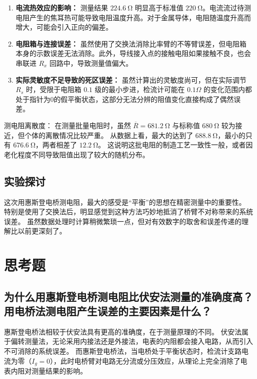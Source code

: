 \documentclass{../template/Report}%
\begin{document}
\begin{fullreportonly}
\begin{enumerate}
        \item \textbf{电流热效应的影响：}
              测量结果 $\SI{224.6}{\ohm}$ 明显高于标准值 $\SI{220}{\ohm}$。电流流过待测电阻产生的焦耳热可能导致电阻温度升高。对于金属导体，电阻随温度升高而增大，可能会引入正向的偏差。

        \item \textbf{电阻箱与连接误差：}
              虽然使用了交换法消除比率臂的不等臂误差，但电阻箱本身的示数误差无法消除。此外，导线接入点的接触电阻如果接触不良，也会串联进 $R_x$ 回路中，导致测量值偏大。

        \item \textbf{实际灵敏度不足导致的死区误差：}
              虽然计算出的灵敏度尚可，但在实际调节 $R_s$ 时，受限于电阻箱 $0.1$ 级的最小步进，检流计可能在 $0.1\Omega$ 的变化范围内都处于指针为0的假平衡状态，这部分无法分辨的阻值变化直接构成了偶然误差。
    \end{enumerate}

    测电阻离散度：
    在测量批量电阻时，虽然 $\overline{R} = \SI{681.2}{\ohm}$ 与标称值 $\SI{680}{\ohm}$ 较为接近，但个体的离散情况比较严重。
    从数据上看，最大的达到了 $\SI{688.8}{\ohm}$，最小的只有 $\SI{676.6}{\ohm}$，两者相差了 $\SI{12.2}{\ohm}$。
    这说明这批电阻的制造工艺一致性一般，或者因老化程度不同导致阻值出现了较大的随机分布。
    \subsection{实验探讨}

    这次用惠斯登电桥测电阻，最大的感受是“平衡”的思想在精密测量中的重要性。
    特别是使用了交换法后，明显感觉到这种方法巧妙地抵消了桥臂不对称带来的系统误差。
    虽然数据处理时计算稍微繁琐一点，但对有效数字的取舍和误差传递的理解比以前更深刻了。

    \section{思考题}

    \subsection{为什么用惠斯登电桥测电阻比伏安法测量的准确度高？用电桥法测电阻产生误差的主要因素是什么？}

    惠斯登电桥法相较于伏安法具有更高的准确度，在于测量原理的不同。
    伏安法属于偏转测量法，无论采用内接法还是外接法，电表的内阻都会接入电路，从而引入不可消除的系统误差。
    而惠斯登电桥法，当电桥处于平衡状态时，检流计支路电流为零（$I_g = 0$），此时电桥臂对电路无分流或分压效应，从理论上完全消除了电表内阻对测量结果的影响。


\end{fullreportonly}
\end{document}
